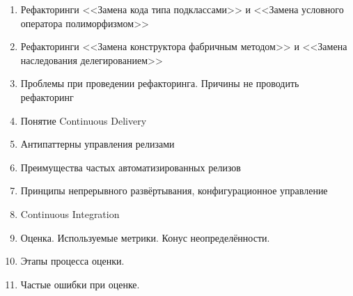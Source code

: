 \documentclass[a5paper]{article}
\begin{document}
\begin{enumerate}
    \item Рефакторинги <<Замена кода типа подклассами>> и <<Замена условного оператора полиморфизмом>>
    \item Рефакторинги <<Замена конструктора фабричным методом>> и <<Замена наследования делегированием>>
    \item Проблемы при проведении рефакторинга. Причины не проводить рефакторинг
    \item Понятие Continuous Delivery
    \item Антипаттерны управления релизами
    \item Преимущества частых автоматизированных релизов
    \item Принципы непрерывного развёртывания, конфигурационное управление
    \item Continuous Integration
    \item Оценка. Используемые метрики. Конус неопределённости.
    \item Этапы процесса оценки.
    \item Частые ошибки при оценке.
\end{enumerate}
\end{document}
